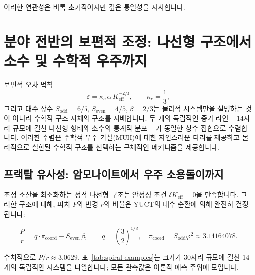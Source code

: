 \documentclass[11pt,a4paper]{article}
\newcommand{\Keff}{K_{\mathrm{eff}}}
\newcommand{\eps}{\varepsilon}
\newcommand{\kappac}{\kappa_c}
\begin{document}
	이러한 연관성은 비록 초기적이지만 깊은 통일성을 시사합니다.
	
	\section{분야 전반의 보편적 조정: 나선형 구조에서 소수 및 수학적 우주까지}
	\label{sec:universal}
	
	보편적 오차 법칙
	\begin{equation}
		\eps = \kappac\,\alpha\,\Keff^{-2/3}, \qquad \kappac = \frac{1}{3},
		\label{eq:errorlaw}
	\end{equation}
	그리고 대수 상수 \(S_{\mathrm{odd}}=6/5\), \(S_{\mathrm{even}}=4/5\), \(\beta=2/3\)는 물리적 시스템만을 설명하는 것이 아니라 수학적 구조 자체의 구조를 지배합니다. 두 개의 독립적인 증거 라인 – 14자리 규모에 걸친 나선형 형태와 소수의 통계적 분포 – 가 동일한 상수 집합으로 수렴합니다. 이러한 수렴은 수학적 우주 가설(MUH)에 대한 자연스러운 다리를 제공하고 물리적으로 실현된 수학적 구조를 선택하는 구체적인 메커니즘을 제공합니다.
	
	\subsection{프랙탈 유사성: 암모나이트에서 우주 소용돌이까지}
	
	조정 소산을 최소화하는 정적 나선형 구조는 안정성 조건 \(\delta K_{\mathrm{eff}} = 0\)을 만족합니다. 그러한 구조에 대해, 피치 \(P\)와 반경 \(r\)의 비율은 YUCT의 대수 순환에 의해 완전히 결정됩니다:
	
	\begin{equation}
		\boxed{ \frac{P}{r} = q \cdot \pi_{\mathrm{coord}} - S_{\mathrm{even}} \, \beta }, \qquad
		q = \left(\frac{3}{2}\right)^{1/3},\quad
		\pi_{\mathrm{coord}} = S_{\mathrm{odd}} \varphi^2 \approx 3.14164078.
		\label{eq:spiral-universal}
	\end{equation}
	
	수치적으로 \(P/r \approx 3.0629\). 표~\ref{tab:spiral-examples}는 크기가 30자리 규모에 걸친 14개의 독립적인 시스템을 나열합니다; 모든 관측값은 이론적 예측 주위에 모입니다.
	
\end{document}
